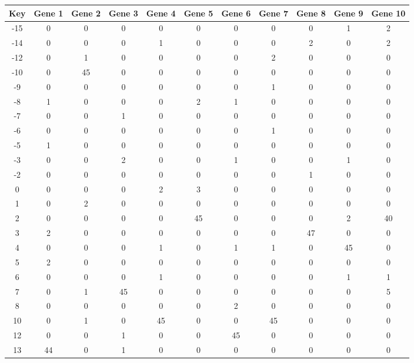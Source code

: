 \begin{tabular}{|c|c|c|c|c|c|c|c|c|c|c|}
\hline
Key & Gene 1 & Gene 2 & Gene 3 & Gene 4 & Gene 5 & Gene 6 & Gene 7 & Gene 8 & Gene 9 & Gene 10 \\
\hline
-15 & 0 & 0 & 0 & 0 & 0 & 0 & 0 & 0 & 1 & 2 \\
-14 & 0 & 0 & 0 & 1 & 0 & 0 & 0 & 2 & 0 & 2 \\
-12 & 0 & 1 & 0 & 0 & 0 & 0 & 2 & 0 & 0 & 0 \\
-10 & 0 & 45 & 0 & 0 & 0 & 0 & 0 & 0 & 0 & 0 \\
-9 & 0 & 0 & 0 & 0 & 0 & 0 & 1 & 0 & 0 & 0 \\
-8 & 1 & 0 & 0 & 0 & 2 & 1 & 0 & 0 & 0 & 0 \\
-7 & 0 & 0 & 1 & 0 & 0 & 0 & 0 & 0 & 0 & 0 \\
-6 & 0 & 0 & 0 & 0 & 0 & 0 & 1 & 0 & 0 & 0 \\
-5 & 1 & 0 & 0 & 0 & 0 & 0 & 0 & 0 & 0 & 0 \\
-3 & 0 & 0 & 2 & 0 & 0 & 1 & 0 & 0 & 1 & 0 \\
-2 & 0 & 0 & 0 & 0 & 0 & 0 & 0 & 1 & 0 & 0 \\
0 & 0 & 0 & 0 & 2 & 3 & 0 & 0 & 0 & 0 & 0 \\
1 & 0 & 2 & 0 & 0 & 0 & 0 & 0 & 0 & 0 & 0 \\
2 & 0 & 0 & 0 & 0 & 45 & 0 & 0 & 0 & 2 & 40 \\
3 & 2 & 0 & 0 & 0 & 0 & 0 & 0 & 47 & 0 & 0 \\
4 & 0 & 0 & 0 & 1 & 0 & 1 & 1 & 0 & 45 & 0 \\
5 & 2 & 0 & 0 & 0 & 0 & 0 & 0 & 0 & 0 & 0 \\
6 & 0 & 0 & 0 & 1 & 0 & 0 & 0 & 0 & 1 & 1 \\
7 & 0 & 1 & 45 & 0 & 0 & 0 & 0 & 0 & 0 & 5 \\
8 & 0 & 0 & 0 & 0 & 0 & 2 & 0 & 0 & 0 & 0 \\
10 & 0 & 1 & 0 & 45 & 0 & 0 & 45 & 0 & 0 & 0 \\
12 & 0 & 0 & 1 & 0 & 0 & 45 & 0 & 0 & 0 & 0 \\
13 & 44 & 0 & 1 & 0 & 0 & 0 & 0 & 0 & 0 & 0 \\
\hline
\end{tabular}